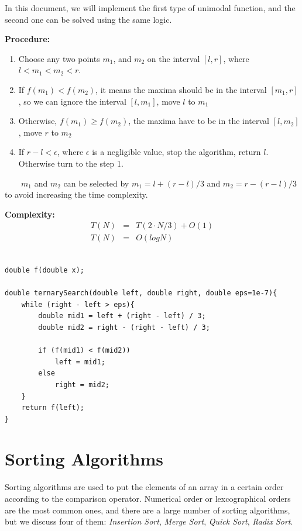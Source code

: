 \documentclass[12pt]{article}
\begin{document}
In this document, we will implement the first type of unimodal function, and the second one can be solved using the same logic.

\textbf{Procedure: }
\begin{enumerate}
	\item Choose any two points $m_1$, and $m_2$ on the interval $[l, r]$, where $l < m_1 < m_2 < r$.
	\item If $f(m_1) < f(m_2)$, it means the maxima should be in the interval $[m_1, r]$, so we can ignore the interval $[l, m_1]$, move $l$ to $m_1$
	\item Otherwise, $f(m_1) \geq f(m_2)$, the maxima have to be in the interval $[l, m_2]$, move $r$ to $m_2$
	\item If $r - l < \epsilon$, where $\epsilon$ is a negligible value, stop the algorithm, return $l$. Otherwise turn to the step 1. 
\end{enumerate}	

\ \ \ \  $m_1$ and $m_2$ can be selected by $m_1 = l + (r - l) / 3$ and $m_2 = r - (r - l) / 3$ to avoid increasing the time complexity.

\textbf{Complexity: }
\begin{eqnarray*}
	T(N) &=& T(2 \cdot N / 3) + O(1) \\
	T(N) &=& O(logN)
\end{eqnarray*}



\begin{verbatim}

double f(double x);

double ternarySearch(double left, double right, double eps=1e-7){
    while (right - left > eps){
        double mid1 = left + (right - left) / 3;
        double mid2 = right - (right - left) / 3;
        
        if (f(mid1) < f(mid2))
            left = mid1;
        else
            right = mid2;
    }
    return f(left);
}
\end{verbatim}

\cleardoublepage

	\section{Sorting Algorithms}

	
	Sorting algorithms are used to put the elements of an array in a certain order according to the comparison operator. Numerical order or lexcographical orders are the most common ones, and there are a large number of sorting algorithms, but we discuss four of them: \textit{Insertion Sort}, \textit{Merge Sort}, \textit{Quick Sort}, \textit{Radix Sort}. 
	
\end{document}
